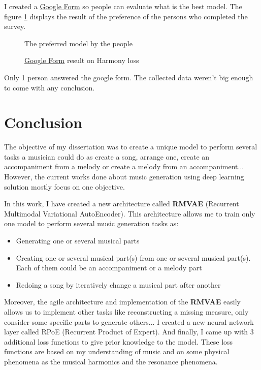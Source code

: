 \documentclass[12pt]{report}
\begin{document}
I created a \href{https://docs.google.com/forms/d/e/1FAIpQLSf1tkCLj78u-IoMYjGWa3iTYWIT_gbPnGIShjFox4whfhkjLw/viewform?usp=sf_link}{Google Form} so people can evaluate what is the best model.
The figure \ref{fig:pie:rpoe} displays the result of the preference of the persons who completed the survey.

\begin{figure}
    \begin{center}
    \caption{\href{https://docs.google.com/forms/d/e/1FAIpQLSf1tkCLj78u-IoMYjGWa3iTYWIT_gbPnGIShjFox4whfhkjLw/viewform?usp=sf_link}{Google Form} result on Harmony loss}
    The preferred model by the people
    \label{fig:pie:rpoe}
    \end{center}
\end{figure}

Only 1 person answered the google form.
The collected data weren't big enough to come with any conclusion.




\chapter{Conclusion}

The objective of my dissertation was to create a unique model to perform several tasks a musician could do as create a song, arrange one, create an accompaniment from a melody or create a melody from an accompaniment... 
However, the current works done about music generation using deep learning solution mostly focus on one objective.

In this work, I have created a new architecture called \textbf{RMVAE} (Recurrent Multimodal Variational AutoEncoder).
This architecture allows me to train only one model to perform several music generation tasks as:
\begin{itemize}
    \item Generating one or several musical parts
    \item Creating one or several musical part(s) from one or several musical part(s).
    Each of them could be an accompaniment or a melody part
    \item Redoing a song by iteratively change a musical part after another
\end{itemize}
Moreover, the agile architecture and implementation of the \textbf{RMVAE} easily allows us to implement other tasks like reconstructing a missing measure, only consider some specific parts to generate others...
I created a new neural network layer called RPoE (Recurrent Product of Expert).
And finally, I came up with 3 additional loss functions to give prior knowledge to the model.
These loss functions are based on my understanding of music and on some physical phenomena as the musical harmonics and the resonance phenomena.
\end{document}
